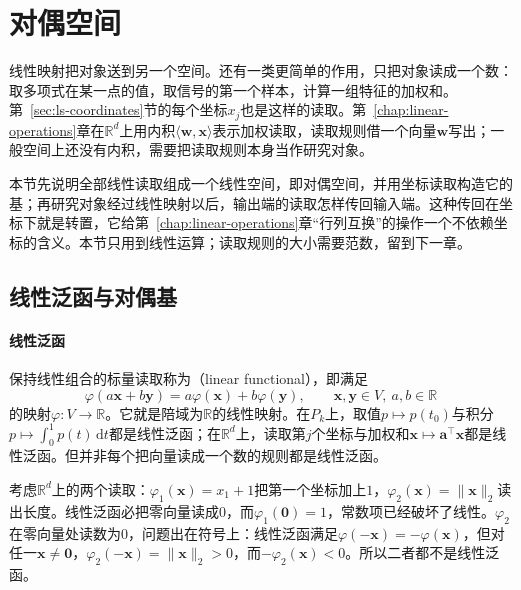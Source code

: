 
\section{对偶空间}
\label{sec:ls-dual-spaces}

线性映射把对象送到另一个空间。还有一类更简单的作用，只把对象读成一个数：取多项式在某一点的值，取信号的第一个样本，计算一组特征的加权和。第~\ref{sec:ls-coordinates}节的每个坐标$x_j$也是这样的读取。第~\ref{chap:linear-operations}章在$\mathbb R^d$上用内积$\langle\bm w,\bm x\rangle$表示加权读取，读取规则借一个向量$\bm w$写出；一般空间上还没有内积，需要把读取规则本身当作研究对象。

本节先说明全部线性读取组成一个线性空间，即对偶空间，并用坐标读取构造它的基；再研究对象经过线性映射以后，输出端的读取怎样传回输入端。这种传回在坐标下就是转置，它给第~\ref{chap:linear-operations}章“行列互换”的操作一个不依赖坐标的含义。本节只用到线性运算；读取规则的大小需要范数，留到下一章。

\subsection{线性泛函与对偶基}
\label{sec:ls-dual-space}

\paragraph{线性泛函}
保持线性组合的标量读取称为（linear functional），即满足
\[
\varphi(a\bm x+b\bm y)=a\varphi(\bm x)+b\varphi(\bm y),\qquad\bm x,\bm y\in V,\ a,b\in\mathbb R
\]
的映射$\varphi:V\to\mathbb R$。它就是陪域为$\mathbb R$的线性映射。在$P_k$上，取值$p\mapsto p(t_0)$与积分$p\mapsto\int_0^1p(t)\,\mathrm dt$都是线性泛函；在$\mathbb R^d$上，读取第$j$个坐标与加权和$\bm x\mapsto\bm a^\top\bm x$都是线性泛函。但并非每个把向量读成一个数的规则都是线性泛函。
\begin{example}[反例：两个非线性的读取]
\label{ex:ls-nonlinear-readouts}
考虑$\mathbb R^d$上的两个读取：$\varphi_1(\bm x)=x_1+1$把第一个坐标加上$1$，$\varphi_2(\bm x)=\lVert\bm x\rVert_2$读出长度。线性泛函必把零向量读成$0$，而$\varphi_1(\bm0)=1$，常数项已经破坏了线性。$\varphi_2$在零向量处读数为$0$，问题出在符号上：线性泛函满足$\varphi(-\bm x)=-\varphi(\bm x)$，但对任一$\bm x\neq\bm0$，$\varphi_2(-\bm x)=\lVert\bm x\rVert_2>0$，而$-\varphi_2(\bm x)<0$。所以二者都不是线性泛函。
\end{example}


